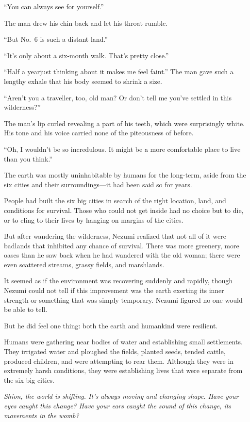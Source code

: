 ``You can always see for yourself.''

The man drew his chin back and let his throat rumble.

``\el But No.~6 is such a distant land.''

``It's only about a six-month walk. That's pretty close.''

``Half a year\el just thinking about it makes me feel faint.'' The man
gave such a lengthy exhale that his body seemed to shrink a size.

``Aren't you a traveller, too, old man? Or don't tell me you've settled
in this wilderness?''

The man's lip curled revealing a part of his teeth, which were
surprisingly white. His tone and his voice carried none of the
piteousness of before.

``Oh, I wouldn't be so incredulous. It might be a more comfortable place
to live than you think.''

The earth was mostly uninhabitable by humans for the long-term, aside
from the six cities and their surroundings---it had been said so for
years.

People had built the six big cities in search of the right location,
land, and conditions for survival. Those who could not get inside had no
choice but to die, or to cling to their lives by hanging on margins of
the cities.

But after wandering the wilderness, Nezumi realized that not all of it
were badlands that inhibited any chance of survival. There was more
greenery, more oases than he saw back when he had wandered with the old
woman; there were even scattered streams, grassy fields, and marshlands.

It seemed as if the environment was recovering suddenly and rapidly,
though Nezumi could not tell if this improvement was the earth exerting
its inner strength or something that was simply temporary. Nezumi
figured no one would be able to tell.

But he did feel one thing: both the earth and humankind were resilient.

Humans were gathering near bodies of water and establishing small
settlements. They irrigated water and ploughed the fields, planted
seeds, tended cattle, produced children, and were attempting to rear
them. Although they were in extremely harsh conditions, they were
establishing lives that were separate from the six big cities.

\emph{Shion, the world is shifting. It's always moving and changing shape.
Have your eyes caught this change? Have your ears caught the sound of
this change, its movements in the womb?}

